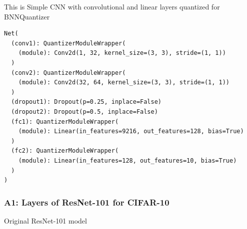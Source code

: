 \documentclass{article}
\begin{document}
This is Simple CNN with convolutional and linear layers quantized for BNNQuantizer
\begin{verbatim}
Net(
  (conv1): QuantizerModuleWrapper(
    (module): Conv2d(1, 32, kernel_size=(3, 3), stride=(1, 1))
  )
  (conv2): QuantizerModuleWrapper(
    (module): Conv2d(32, 64, kernel_size=(3, 3), stride=(1, 1))
  )
  (dropout1): Dropout(p=0.25, inplace=False)
  (dropout2): Dropout(p=0.5, inplace=False)
  (fc1): QuantizerModuleWrapper(
    (module): Linear(in_features=9216, out_features=128, bias=True)
  )
  (fc2): QuantizerModuleWrapper(
    (module): Linear(in_features=128, out_features=10, bias=True)
  )
)
\end{verbatim}

\subsubsection{A1: Layers of ResNet-101 for CIFAR-10}
\label{sec:A2}
Original ResNet-101 model
\end{document}

